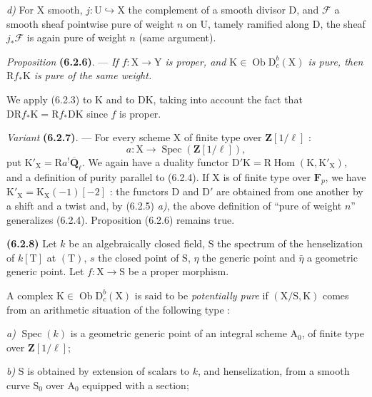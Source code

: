 \documentclass[11pt,leqno]{article}
\begin{document}
\textit{d)} For \(\mathrm{X}\) smooth,
\(j:\mathrm{U}\hookrightarrow\mathrm{X}\) the complement of a
smooth divisor \(\mathrm{D}\), and \(\mathscr{F}\) a smooth sheaf
pointwise pure of weight \(n\) on \(\mathrm{U}\), tamely
ramified along \(\mathrm{D}\), the sheaf \(j_*\mathscr{F}\)
is again pure of weight \(n\) (same argument).

\textit{Proposition} \textbf{(6.2.6)}. — \textit{If
\(f:\mathrm{X}\to\mathrm{Y}\) is proper, and
\(\mathrm{K}\in\operatorname{Ob}\mathrm{D}_c^b(\mathrm{X})\) is
pure, then \(\mathrm{R}f_*\mathrm{K}\) is pure of the same weight.}

We apply (6.2.3) to \(\mathrm{K}\) and to \(\mathrm{D}\mathrm{K}\),
taking into account the fact that
\(\mathrm{D}\mathrm{R}f_*\mathrm{K}
=\mathrm{R}f_*\mathrm{D}\mathrm{K}\) since \(f\) is proper.

\textit{Variant} \textbf{(6.2.7)}. — For every scheme \(\mathrm{X}\)
of finite type over \(\mathbf{Z}[1/\ell]\) :
\[
a:\mathrm{X}\to\operatorname{Spec}(\mathbf{Z}[1/\ell]),
\]
put \(\mathrm{K}'_{\mathrm{X}}=\mathrm{R}a^!\overline{\mathbf{Q}}_\ell\).
We again have a duality functor
\(\mathrm{D}'\mathrm{K}
=\mathrm{R}\operatorname{Hom}(\mathrm{K},\mathrm{K}'_{\mathrm{X}})\),
and a definition of purity parallel to (6.2.4). If
\(\mathrm{X}\) is of finite type over \(\mathbf{F}_p\), we have
\(\mathrm{K}'_{\mathrm{X}}=\mathrm{K}_{\mathrm{X}}(-1)[-2]\) :
the functors \(\mathrm{D}\) and \(\mathrm{D}'\) are obtained from one
another by a shift and a twist and, by (6.2.5) \textit{a)},
the above definition of “pure of weight \(n\)” generalizes
(6.2.4). Proposition (6.2.6) remains true.

\textbf{(6.2.8)} Let \(k\) be an algebraically closed field,
\(\mathrm{S}\) the spectrum of the henselization of \(k[\mathrm{T}]\) at
\((\mathrm{T})\), \(s\) the closed point of \(\mathrm{S}\), \(\eta\)
the generic point and \(\bar{\eta}\) a geometric generic point.
Let \(f:\mathrm{X}\to\mathrm{S}\) be a proper morphism.

A complex \(\mathrm{K}\in\operatorname{Ob}\mathrm{D}_c^b(\mathrm{X})\)
is said to be \textit{potentially pure} if
\((\mathrm{X}/\mathrm{S},\mathrm{K})\) comes from an arithmetic
situation of the following type :

\textit{a)} \(\operatorname{Spec}(k)\) is a geometric generic
point of an integral scheme \(\mathrm{A}_0\), of finite type over
\(\mathbf{Z}[1/\ell]\);

\textit{b)} \(\mathrm{S}\) is obtained by extension of scalars to
\(k\), and henselization, from a smooth curve \(\mathrm{S}_0\) over
\(\mathrm{A}_0\) equipped with a section;
\end{document}
